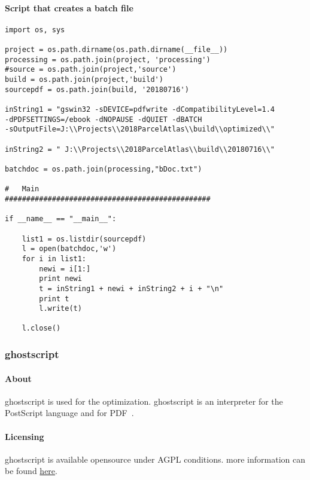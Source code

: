 \documentclass[class=article , crop=false, titlepage, twoside, multi={itemize, figure, verbatim}, float=false]{standalone}
\begin{document}
\paragraph*{Script that creates a batch file}
\begin{verbatim}
import os, sys

project = os.path.dirname(os.path.dirname(__file__))
processing = os.path.join(project, 'processing')
#source = os.path.join(project,'source')
build = os.path.join(project,'build')
sourcepdf = os.path.join(build, '20180716')

inString1 = "gswin32 -sDEVICE=pdfwrite -dCompatibilityLevel=1.4
-dPDFSETTINGS=/ebook -dNOPAUSE -dQUIET -dBATCH
-sOutputFile=J:\\Projects\\2018ParcelAtlas\\build\\optimized\\"

inString2 = " J:\\Projects\\2018ParcelAtlas\\build\\20180716\\"

batchdoc = os.path.join(processing,"bDoc.txt")

#   Main
################################################

if __name__ == "__main__":

    list1 = os.listdir(sourcepdf)
    l = open(batchdoc,'w')
    for i in list1:
        newi = i[1:]
        print newi
        t = inString1 + newi + inString2 + i + "\n"
        print t
        l.write(t)

    l.close()

\end{verbatim}

\subsubsection{ghostscript}

\paragraph{About}
ghostscript is used for the optimization. ghostscript is an interpreter for the PostScript language and for PDF~\cite{ghostscript1}.
\paragraph{Licensing}
ghostscript is available opensource under AGPL conditions.  more information can be found \href{https://www.ghostscript.com/license.html}{here}.
\end{document}
